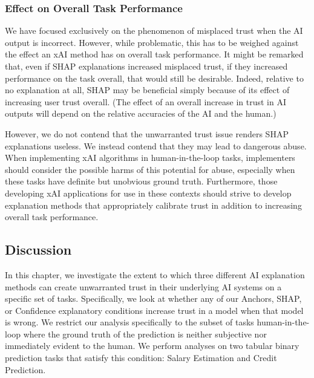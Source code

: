 \subsubsection{Effect on Overall Task Performance}

We have focused exclusively on the phenomenon of misplaced trust when the AI output is incorrect. However, while problematic, this has to be weighed against the effect an xAI method has on overall task performance. It might be remarked that, even if SHAP explanations increased misplaced trust, if they increased performance on the task overall, that would still be desirable. Indeed, relative to no explanation at all, SHAP may be beneficial simply because of its effect of increasing user trust overall. (The effect of an overall increase in trust in AI outputs will depend on the relative accuracies of the AI and the human.)

However, we do not contend that the unwarranted trust issue renders SHAP explanations useless. We instead contend that they may lead to dangerous abuse. When implementing xAI algorithms in human-in-the-loop tasks, implementers should consider the possible harms of this potential for abuse, especially when these tasks have definite but unobvious ground truth. Furthermore, those developing xAI applications for use in these contexts should strive to develop explanation methods that appropriately calibrate trust in addition to increasing overall task performance.

\subsection{Discussion}
In this chapter, we investigate the extent to which three different AI explanation methods can create unwarranted trust in their underlying AI systems on a specific set of tasks. Specifically, we look at whether any of our Anchors, SHAP, or Confidence explanatory conditions increase trust in a model when that model is wrong. We restrict our analysis specifically to the subset of tasks human-in-the-loop where the ground truth of the prediction is neither subjective nor immediately evident to the human. We perform analyses on two tabular binary prediction tasks that satisfy this condition: Salary Estimation and Credit Prediction.

